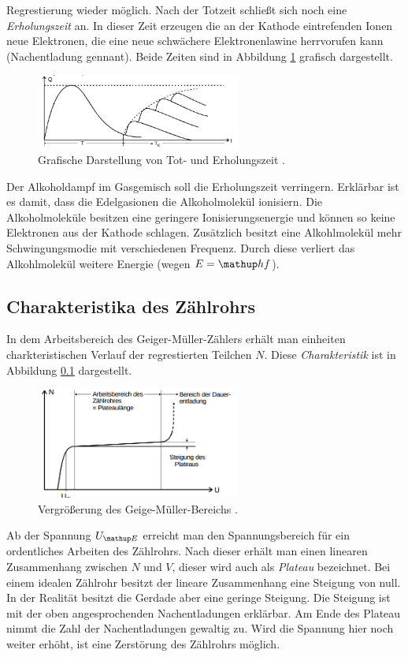 Regrestierung wieder möglich. Nach der Totzeit schließt sich
noch eine \emph{Erholungszeit} an. In dieser Zeit erzeugen
die an der Kathode eintrefenden Ionen neue Elektronen, die eine neue
schwächere Elektronenlawine herrvorufen kann (Nachentladung gennant). Beide Zeiten sind
in Abbildung \ref{fig: tot_und_erholungszeit} grafisch dargestellt.
\begin{figure}
  \centering
  \includegraphics[width=0.6\textwidth]{bilder/totzeit.png}
  \caption{Grafische Darstellung von Tot- und Erholungszeit \cite{anleitung703}.}
  \label{fig: tot_und_erholungszeit}
  \end{figure}
Der Alkoholdampf im Gasgemisch
soll die Erholungszeit verringern. Erklärbar ist es damit, dass
die Edelgasionen die Alkoholmolekül ionisiern. Die Alkoholmoleküle
besitzen eine geringere Ionisierungsenergie und können so keine Elektronen aus
der Kathode schlagen. Zusätzlich besitzt eine Alkohlmolekül mehr Schwingungsmodie
mit verschiedenen Frequenz. Durch diese verliert das Alkohlmolekül
weitere Energie (wegen $E=\map{h}f$).

\subsection{Charakteristika des Zählrohrs}
In dem Arbeitsbereich des Geiger-Müller-Zählers erhält man einheiten
charkteristischen Verlauf der regrestierten Teilchen $N$.
Diese \emph{Charakteristik} ist in Abbildung \ref{} dargestellt.
\begin{figure}
  \centering
  \includegraphics[width=0.6\textwidth]{bilder/plateau.png}
  \caption{Vergrößerung des Geige-Müller-Bereichs \cite{anleitung703}.}
  \label{fig: plateau}
\end{figure}
Ab der Spannung $U\ua{E}$ erreicht man den Spannungsbereich für ein
ordentliches Arbeiten des Zählrohrs. Nach dieser erhält man einen
linearen Zusammenhang zwischen $N$ und $V$, dieser wird auch als
\emph{Plateau} bezeichnet. Bei einem idealen Zählrohr besitzt der
lineare Zusammenhang eine Steigung von null. In der Realität besitzt
die Gerdade aber eine geringe Steigung. Die Steigung ist mit der oben
angesprochenden Nachentladungen erklärbar. Am Ende des Plateau nimmt die
Zahl der Nachentladungen gewaltig zu. Wird die Spannung hier noch weiter erhöht,
ist eine Zerstörung des Zählrohrs möglich.

